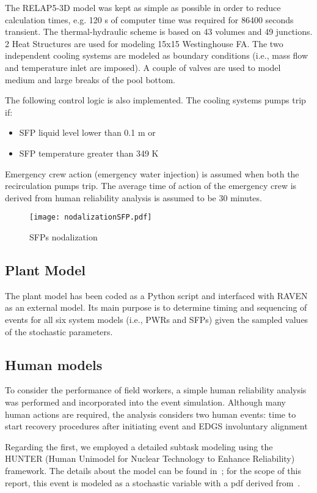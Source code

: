 The RELAP5-3D model was kept as simple as possible in order to reduce calculation times, e.g. 120 s 
of computer time was required for 86400 seconds transient. The thermal-hydraulic scheme is based on
43 volumes and 49 junctions. 2 Heat Structures are used for modeling 15x15 Westinghouse FA. 
The two independent cooling systems are modeled as boundary conditions (i.e., mass flow and 
temperature inlet are imposed). A couple of valves are used to model medium and large breaks of the pool bottom.

The following control logic is also implemented. The cooling systems pumps trip if: 
\begin{itemize}
  \item SFP liquid level lower than 0.1 m or
  \item SFP temperature greater than 349 K
\end{itemize}

Emergency crew action (emergency water injection) is assumed when both the recirculation pumps trip. 
The average time of action of the emergency crew is derived from human reliability analysis is assumed 
to be 30 minutes.

\begin{figure}
    \centering
    \texttt{[image: nodalizationSFP.pdf]}
    \caption{SFPs nodalization}
    \label{fig:SFPnodalization}
\end{figure}


\subsection{Plant Model}
\label{sec:plantModel}
The plant model has been coded as a Python script and interfaced with RAVEN as an 
external model. Its main purpose is to determine timing and sequencing of events 
for all six system models (i.e., PWRs and SFPs) given the sampled values of the 
stochastic parameters.

\subsection{Human models}
To consider the performance of field workers, a simple human reliability analysis was 
performed and incorporated into the event simulation. Although many human actions are 
required, the analysis considers two human events: time to start recovery procedures 
after initiating event and EDGS involuntary alignment

Regarding the first, we employed a detailed subtask modeling using the HUNTER (Human Unimodel 
for Nuclear Technology to Enhance Reliability)~\cite{boringHUNTER} framework. The details about 
the model can be found in~\cite{hunterReport2016}; for the scope of this report, this event 
is modeled as a stochastic variable with a pdf derived from~\cite{hunterReport2016}. 

